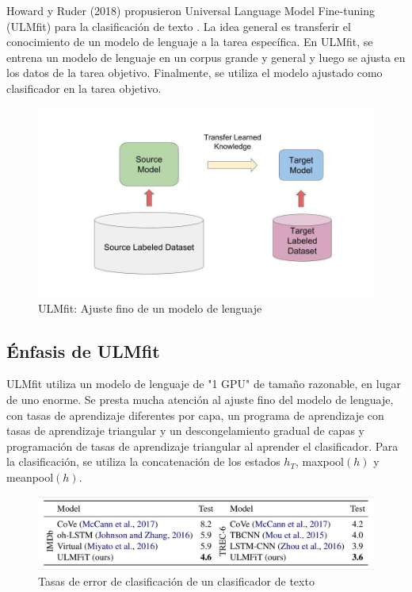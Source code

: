 Howard y Ruder (2018) propusieron Universal Language Model Fine-tuning (ULMfit) para la clasificación de texto \cite{howard-ruder-2018-universal}. La idea general es transferir el conocimiento de un modelo de lenguaje a la tarea específica. En ULMfit, se entrena un modelo de lenguaje en un corpus grande y general y luego se ajusta en los datos de la tarea objetivo. Finalmente, se utiliza el modelo ajustado como clasificador en la tarea objetivo.

\begin{figure}[h]
  \centering
  \includegraphics[scale=0.29]{pics/ulmfit1.png}
  \caption{ULMfit: Ajuste fino de un modelo de lenguaje}
\end{figure}

\subsection{Énfasis de ULMfit}

ULMfit utiliza un modelo de lenguaje de "1 GPU" de tamaño razonable, en lugar de uno enorme. Se presta mucha atención al ajuste fino del modelo de lenguaje, con tasas de aprendizaje diferentes por capa, un programa de aprendizaje con tasas de aprendizaje triangular y un descongelamiento gradual de capas y programación de tasas de aprendizaje triangular al aprender el clasificador. Para la clasificación, se utiliza la concatenación de los estados $h_T$, maxpool$(h)$ y meanpool$(h)$.

\begin{figure}[h]
  \centering
  \includegraphics[scale=0.2]{pics/ulmfit3.png}
  \caption{Tasas de error de clasificación de un clasificador de texto}
\end{figure}

